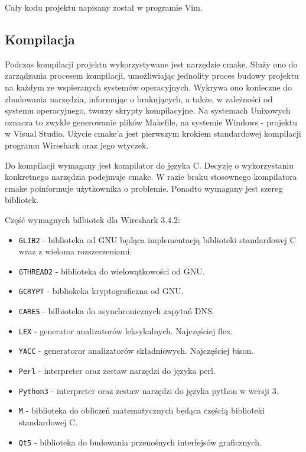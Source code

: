 \documentclass[a4paper, 12pt, twoside, openright]{article}
\begin{document}
	Cały kodu projektu napisany został w programie Vim.

\subsection{Kompilacja}

	\indent\par
	Podczas kompilacji projektu wykorzystywane jest narzędzie cmake. Służy ono do zarządzania procesem kompilacji,
	umożliwiając jednolity proces budowy projektu
	na każdym ze wspieranych systemów operacyjnych. Wykrywa ono konieczne do zbudowania narzędzia, informując
	o brakujących, a także, w zależności od systemu operacyjnego, tworzy skrypty kompilacyjne. Na systemach Unixowych
	oznacza to zwykle generowanie plików Makefile, na systemie Windows - projektu w Visual Studio. Użycie cmake'a
	jest pierwszym krokiem standardowej kompilacji programu Wireshark oraz jego wtyczek.
	
	Do kompilacji wymagany jest kompilator do języka C. Decyzję o wykorzystaniu konkretnego narzędzia podejmuje cmake.
	W razie braku stosownego kompilatora cmake poinformuje użytkownika o problemie. Ponadto wymagany jest szereg
	bibliotek.

	\newpage

	Część wymagnych bilbiotek dla Wireshark 3.4.2:
	\begin{itemize}
		\item \texttt{GLIB2} - biblioteka od GNU będąca implementacją biblioteki standardowej C wraz z wieloma rozszerzeniami.
		\item \texttt{GTHREAD2} - biblioteka do wielowątkowości od GNU.
		\item \texttt{GCRYPT} - bibliokeka kryptograficzna od GNU.
		\item \texttt{CARES} - bilbioteka do asynchronicznych zapytań DNS.
		\item \texttt{LEX} - generator analizatorów leksykalnych. Najczęściej flex.
		\item \texttt{YACC} - generatoror analizatorów składniowych. Najczęściej bison.
		\item \texttt{Perl} - interpreter oraz zestaw narzędzi do języka perl.
		\item \texttt{Python3} - interpreter oraz zestaw narzędzi do języka python w wersji 3.
		\item \texttt{M} - biblioteka do obliczeń matematycznych będąca częścią biblioteki standardowej C.
		\item \texttt{Qt5} - biblioteka do budowania przenośnych interfejsów graficznych.
	\end{itemize}
\end{document}
